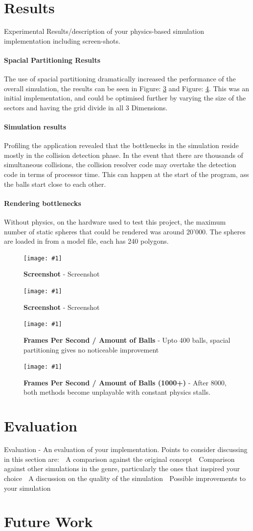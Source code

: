 \documentclass[conference]{acmsiggraph}
\newcommand{\figuremacroW}[4]{
	\begin{figure}[h] %
		\centering
		\texttt{[image: \#1]}
		\caption[#2]{\textbf{#2} - #3}
		\label{fig:#1}
	\end{figure}
}
\newcommand{\figuremacroF}[4]{
	\begin{figure}[h] %
		\centering
		\texttt{[image: \#1]}
		\caption[#2]{\textbf{#2} - #3}
		\label{fig:#1}
	\end{figure}
}
\begin{document}
\section{Results}
Experimental Results/description of your physics-based simulation implementation
including screen-shots.


\paragraph{Spacial Partitioning Results}
The use of spacial partitioning dramatically increased the performance of the overall simulation, the results can be seen in Figure: \ref{fig:chart1-a} and Figure: \ref{fig:chart1-b}. 
This was an initial implementation, and could be optimised further by varying the size of the sectors and having the grid divide in all 3 Dimensions.

\paragraph{Simulation results}
Profiling the application revealed that the bottlenecks in the simulation reside mostly in the collision detection phase. In the event that there are thousands of simultaneous collisions, the collision resolver code may overtake the detection code in terms of processor time. This can happen at the start of the program, ass the balls start close to each other.

\paragraph{Rendering bottlenecks}
Without physics, on the hardware used to test this project, the maximum number of static spheres that could be rendered was around 20'000. The spheres are loaded in from a model file, each has 240 polygons.


\figuremacroW
{screen2}
{Screenshot}
{Screenshot}
{1.0}

\figuremacroW
{screen1}
{Screenshot}
{Screenshot}
{1.0}

\figuremacroF
{chart1-a}
{Frames Per Second / Amount of Balls}
{Upto 400 balls, spacial partitioning gives no noticeable improvement}
{1.0}

\figuremacroF
{chart1-b}
{Frames Per Second / Amount of Balls (1000+)}
{After 8000, both methods become unplayable with constant physics stalls.}
{1.0}


\section{Evaluation}
Evaluation - An evaluation of your implementation. Points to consider discussing in this
section are:
 A comparison against the original concept
 Comparison against other simulations in the genre, particularly the ones that
inspired your choice
 A discussion on the quality of the simulation
 Possible improvements to your simulation

\section{Future Work}








\end{document}
